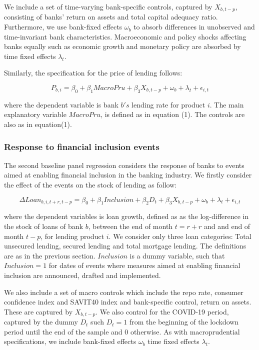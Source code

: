 \documentclass[
  letterpaper,
  DIV=11,
  numbers=noendperiod]{scrartcl}
\begin{document}
We include a set of time-varying bank-specific controls, captured by
\(X_{b,t-p}\), consisting of banks' return on assets and total capital
adequacy ratio. Furthermore, we use bank-fixed effects \(\omega_{b}\) to
absorb differences in unobserved and time-invariant bank
characteristics. Macroeconomic and policy shocks affecting banks equally
such as economic growth and monetary policy are absorbed by time fixed
effects \(\lambda_{t}\).

Similarly, the specification for the price of lending follows:

\begin{equation}
    P_{b,i}= \beta_{0}+\beta_{1}MacroPru +\beta_{3}X_{b,t-p}+ \omega_{b}+ \lambda_{t}+\epsilon_{i,t}
\end{equation}

where the dependent variable is bank \(b's\) lending rate for product
\(i\). The main explanatory variable \(MacroPru\), is defined as in
equation (1). The controls are also as in equation(1).

\subsubsection{Response to financial inclusion events}

The second baseline panel regression considers the response of banks to
events aimed at enabling financial inclusion in the banking industry. We
firstly consider the effect of the events on the stock of lending as
follow:

\begin{equation}
     \Delta Loan_{b,i,t+r,t-p}= \beta_{0}+\beta_{1}Inclusion+ \beta_{2}D_{t}+\beta_{3}X_{b,t-p}+ \omega_{b}+ \lambda_{t}+\epsilon_{i,t}
\end{equation}

where the dependent variables is loan growth, defined as as the
log-difference in the stock of loans of bank \(b\), between the end of
month \(t=r+r\) and and end of month \(t-p\), for lending product \(i\).
We consider only three loan categories: Total unsecured lending, secured
lending and total mortgage lending. The definitions are as in the
previous section. \(Inclusion\) is a dummy variable, such that
\(Inclusion=1\) for dates of events where measures aimed at enabling
financial inclusion are announced, drafted and implemented.

We also include a set of macro controls which include the repo rate,
consumer confidence index and SAVIT40 index and bank-specific control,
return on assets. These are captured by \(X_{b,t-p}\). We also control
for the COVID-19 period, captured by the dummy \(D_{t}\) such
\(D_{t}=1\) from the beginning of the lockdown period until the end of
the sample and \(0\) otherwise. As with macroprudential specifications,
we include bank-fixed effects \(\omega_{b}\) time fixed effects
\(\lambda_{t}\).
\end{document}
